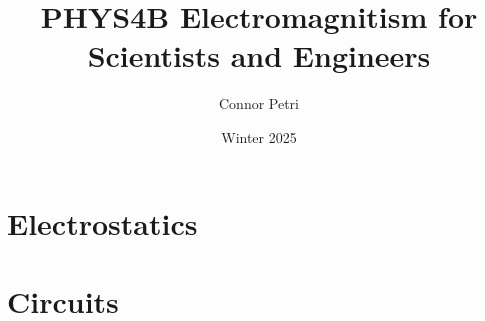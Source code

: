 \documentclass[12pt, letterpaper]{article}
\title{PHYS4B Electromagnitism for Scientists and Engineers}
\author{Connor Petri}
\date{Winter 2025}
\begin{document}
\maketitle
\tableofcontents

\pagebreak

\section{Electrostatics}





\section{Circuits}




\end{document}
